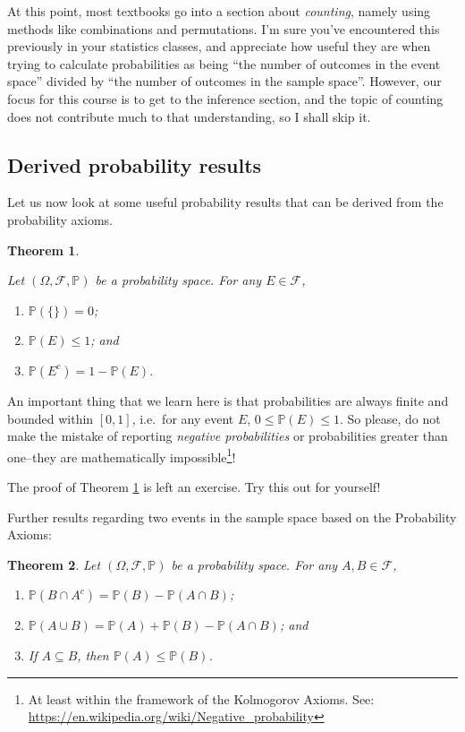 \documentclass[
]{book}
\providecommand{\tightlist}{%
  \setlength{\itemsep}{0pt}\setlength{\parskip}{0pt}}
\newcommand{\bbP}{\mathbb{P}}
\newcommand{\cF}{{\mathcal F}}
\newtheorem{theorem}{Theorem}[chapter]
\theoremstyle{definition}
\theoremstyle{definition}
\theoremstyle{definition}
\theoremstyle{definition}
\theoremstyle{remark}
\begin{document}
At this point, most textbooks go into a section about \emph{counting}, namely using methods like combinations and permutations.
I'm sure you've encountered this previously in your statistics classes, and appreciate how useful they are when trying to calculate probabilities as being ``the number of outcomes in the event space'' divided by ``the number of outcomes in the sample space''.
However, our focus for this course is to get to the inference section, and the topic of counting does not contribute much to that understanding, so I shall skip it.

\hypertarget{derived-probability-results}{%
\subsection{Derived probability results}\label{derived-probability-results}}

Let us now look at some useful probability results that can be derived from the probability axioms.

\begin{theorem}
\protect\hypertarget{thm:derivedprobres1}{}\label{thm:derivedprobres1}

Let \((\Omega,\cF,\bbP)\) be a probability space. For any \(E\in\cF\),

\begin{enumerate}
\def\labelenumi{\roman{enumi}.}
\tightlist
\item
  \(\bbP(\{\}) = 0\);
\item
  \(\bbP(E) \leq 1\); and
\item
  \(\bbP(E^c)=1-\bbP(E).\)
\end{enumerate}

\end{theorem}

An important thing that we learn here is that probabilities are always finite and bounded within \([0,1]\), i.e.~for any event \(E\), \(0 \leq \bbP(E) \leq 1\).
So please, do not make the mistake of reporting \emph{negative probabilities} or probabilities greater than one--they are mathematically impossible\footnote{At least within the framework of the Kolmogorov Axioms. See: \url{https://en.wikipedia.org/wiki/Negative_probability}}!

The proof of Theorem \ref{thm:derivedprobres1} is left an exercise. Try this out for yourself!

Further results regarding two events in the sample space based on the Probability Axioms:

\begin{theorem}

Let \((\Omega,\cF,\bbP)\) be a probability space. For any \(A,B \in\cF\),

\begin{enumerate}
\def\labelenumi{\roman{enumi}.}
\tightlist
\item
  \(\bbP(B \cap A^c) = \bbP(B) - \bbP(A\cap B)\);
\item
  \(\bbP(A \cup B) = \bbP(A) + \bbP(B) - \bbP(A \cap B)\); and
\item
  If \(A \subseteq B\), then \(\bbP(A) \leq \bbP(B)\).
\end{enumerate}

\end{theorem}
\end{document}
